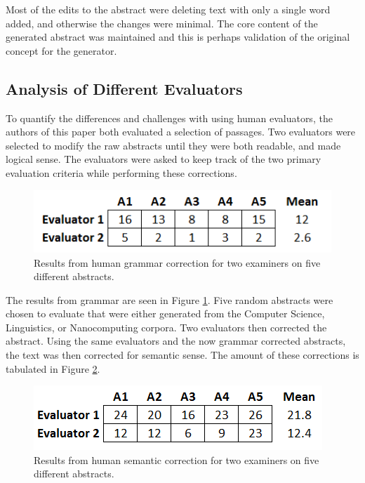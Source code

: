 \documentclass[letterpaper, 10 pt, conference]{ieeeconf}  %
\begin{document}
Most of the edits to the abstract were deleting text with only a single word added, and otherwise the changes were minimal. The core content of the generated abstract was maintained and this is perhaps validation of the original concept for the generator.

\subsection{Analysis of Different Evaluators}

To quantify the differences and challenges with using human evaluators, the authors of this paper both evaluated a selection of passages. Two evaluators were selected to modify the raw abstracts until they were both readable, and made logical sense. The evaluators were asked to keep track of the two primary evaluation criteria while performing these corrections.

\begin{figure}[!ht]
	\centering
	\includegraphics[width=.4\textwidth]{grammer_result}
	\caption{Results from human grammar correction for two examiners on five different abstracts.}
	\label{fig:grammarresult}
\end{figure}

The results from grammar are seen in Figure \ref{fig:grammarresult}. Five random abstracts were chosen to evaluate that were either generated from the Computer Science, Linguistics, or Nanocomputing corpora. Two evaluators then corrected the abstract. Using the same evaluators and the now grammar corrected abstracts, the text was then corrected for semantic sense. The amount of these corrections is tabulated in Figure \ref{fig:semanticresult}.

\begin{figure}[!ht]
	\centering
	\includegraphics[width=.4\textwidth]{semantic_result}
	\caption{Results from human semantic correction for two examiners on five different abstracts.}
	\label{fig:semanticresult}
\end{figure}
\end{document}
